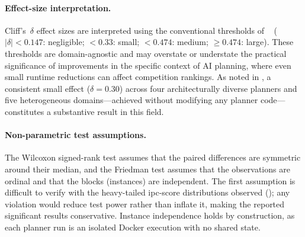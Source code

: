 \paragraph{Effect-size interpretation.}
Cliff's~$\delta$ effect sizes are interpreted using the conventional thresholds of \citeauthor{Romano2006}~\cite{Romano2006} ($|\delta| < 0.147$: negligible; $< 0.33$: small; $< 0.474$: medium; $\geq 0.474$: large).
These thresholds are domain-agnostic and may overstate or understate the practical significance of improvements in the specific context of AI planning, where even small runtime reductions can affect competition rankings.
As noted in , a consistent small effect ($\delta = 0.30$) across four architecturally diverse planners and five heterogeneous domains---achieved without modifying any planner code---constitutes a substantive result in this field.

\paragraph{Non-parametric test assumptions.}
The Wilcoxon signed-rank test assumes that the paired differences are symmetric around their median, and the Friedman test assumes that the observations are ordinal and that the blocks (instances) are independent.
The first assumption is difficult to verify with the heavy-tailed \gls{ipc}-score distributions observed (); any violation would reduce test power rather than inflate it, making the reported significant results conservative.
Instance independence holds by construction, as each planner run is an isolated Docker execution with no shared state.
